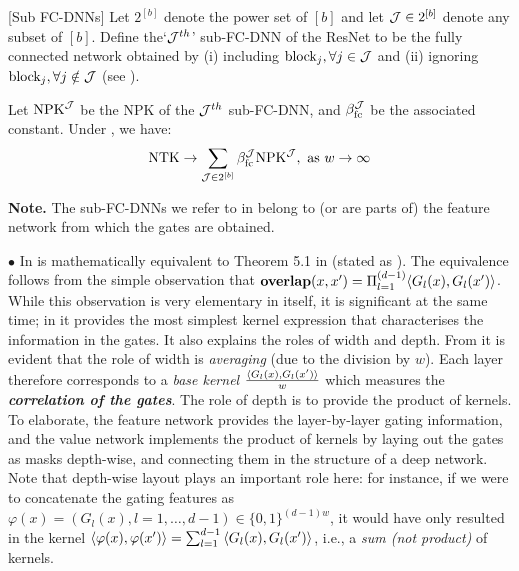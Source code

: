 \begin{definition}\label{def:subfcdnn}[Sub FC-DNNs]
Let $2^{[b]}$ denote the power set of $[b]$ and let $\mathcal{J}\in 2^{[b]}$ denote any subset of $[b]$. Define the`$\mathcal{J}^{th}$' sub-FC-DNN of the ResNet to be the fully connected network obtained by (i) including  $\text{block}_{j},\forall j\in \mathcal{J}$  and (ii) ignoring $\text{block}_{j},\forall j\notin \mathcal{J}$ (see ).
\end{definition}
\begin{theorem}
\label{th:res} Let $\text{NPK}^{\mathcal{J}}$ be the NPK of the $\mathcal{J}^{th}$ sub-FC-DNN, and $\beta_{\text{fc}}^{\mathcal{J}}$ be the associated constant. Under , we have:
\begin{align*}
\text{NTK}\rightarrow \sum_{\mathcal{J}\in 2^{[b]}}  \beta_{\text{fc}}^{\mathcal{J}} \text{NPK}^{\mathcal{J}}, \,\, \text{as}\,\,  w\rightarrow\infty
\end{align*}
\end{theorem}
\textbf{Note.} The sub-FC-DNNs we refer to in  belong to (or are parts of) the feature network from which the gates are obtained. 

$\bullet$  In  is mathematically equivalent to Theorem 5.1 in \citep{npk} (stated as ). The equivalence follows from the simple observation that $\textbf{overlap}(x,x')=\Pi_{l=1}^{(d-1)}\langle G_l(x),G_l(x')\rangle$. %
While this observation is very elementary in itself, it is significant at the same time; in  it provides the most simplest kernel expression that characterises the information in the gates. It also explains the roles of width and depth. From  it is evident that the role of width is \emph{averaging} (due to the division by $w$). Each layer therefore corresponds to a \emph{base kernel} $\frac{\langle G_l(x),G_l(x')\rangle}w$ which measures the \emph{\textbf{correlation of the gates}}. The role of depth is to provide the product of kernels. To elaborate, the feature network provides the layer-by-layer gating information, and the value network implements the product of kernels by laying out the gates as masks depth-wise, and connecting them in the structure of a deep network. Note that depth-wise layout plays an important role here: for instance, if we were to concatenate the gating features as $\varphi(x)=(G_l(x),l=1,\ldots,d-1)\in\{0,1\}^{(d-1)w}$, it would have only resulted in the kernel $\langle \varphi(x),\varphi(x')\rangle=\sum_{l=1}^{d-1}{\langle G_l(x),G_l(x')\rangle}$, i.e., a \emph{sum  (not product)} of kernels. 

